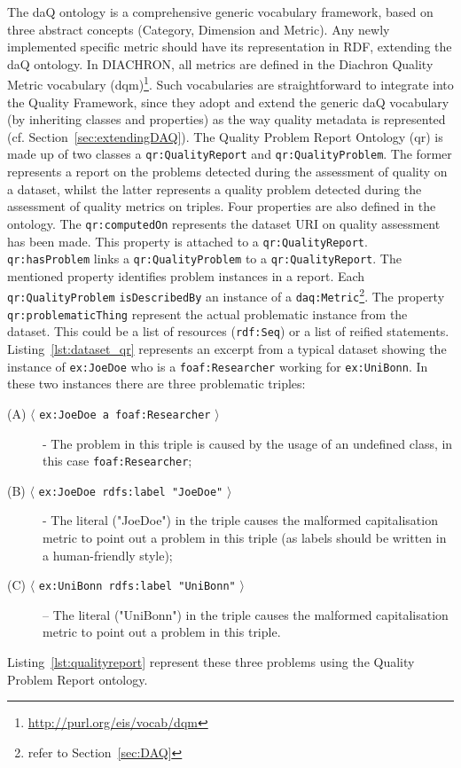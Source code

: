 The daQ ontology is a comprehensive generic vocabulary framework, based on three abstract concepts (Category, Dimension and Metric). 
Any newly implemented specific metric should have its representation in RDF, extending the daQ ontology. In DIACHRON, all metrics are defined in the Diachron Quality Metric vocabulary (dqm)\footnote{\url{http://purl.org/eis/vocab/dqm}}. 
Such vocabularies are straightforward to integrate into the Quality Framework, since they adopt and extend the generic daQ vocabulary (by inheriting classes and properties) as the way quality metadata is represented (cf. Section~\ref{sec:extendingDAQ}).
The Quality Problem Report Ontology (qr) is made up of two classes a \texttt{qr:QualityReport} and \texttt{qr:QualityProblem}. 
The former represents a report on the problems detected during the assessment of quality on a dataset, whilst the latter represents a quality problem detected during the assessment of quality metrics on triples. 
Four properties are also defined in the ontology. 
The \texttt{qr:computedOn} represents the dataset URI on quality assessment has been made. 
This property is attached to a \texttt{qr:QualityReport}. \texttt{qr:hasProblem} links a \texttt{qr:QualityProblem} to a \texttt{qr:QualityReport}. 
The mentioned property identifies problem instances in a report. 
Each \texttt{qr:QualityProblem} \texttt{isDescribedBy} an instance of a \texttt{daq:Metric}\footnote{refer to Section~\ref{sec:DAQ}}. 
The property \texttt{qr:problematicThing} represent the actual problematic instance from the dataset. This could be a list of resources (\texttt{rdf:Seq}) or a list of reified statements.
Listing~\ref{lst:dataset_qr} represents an excerpt from a typical dataset showing the instance of \texttt{ex:JoeDoe} who is a \texttt{foaf:Researcher} working for \texttt{ex:UniBonn}.
In these two instances there are three problematic triples:
\begin{description}
\item [(A) $\langle$ \texttt{ex:JoeDoe a foaf:Researcher} $\rangle$] - The problem in this triple is caused by the usage of an undefined class, in this case \texttt{foaf:Researcher};
\item [(B) $\langle$ \texttt{ex:JoeDoe rdfs:label "JoeDoe"} $\rangle$] - The literal ("JoeDoe") in the triple causes the malformed capitalisation metric to point out a problem in this triple (as labels should be written in a human-friendly style);
\item [(C) $\langle$ \texttt{ex:UniBonn rdfs:label "UniBonn"} $\rangle$] – The literal ("UniBonn") in the triple causes the malformed capitalisation metric to point out a problem in this triple.
\end{description}
Listing~\ref{lst:qualityreport} represent these three problems using the Quality Problem Report ontology.



